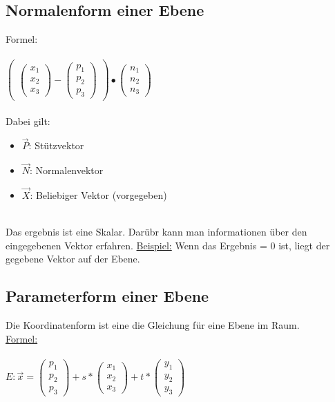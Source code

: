 \subsection{Normalenform einer Ebene}
Formel: \\\\
$
\begin{pmatrix}
    \begin{pmatrix}
        x_1 \\ x_2 \\ x_3
    \end{pmatrix}
    -
    \begin{pmatrix}
        p_1 \\ p_2 \\ p_3
    \end{pmatrix}
\end{pmatrix}
\bullet
\begin{pmatrix}
    n_1 \\ n_2 \\ n_3
\end{pmatrix}
$
\\\\
Dabei gilt:
\begin{itemize}
    \item $\vec{P}$: Stützvektor
    \item $\vec{N}$: Normalenvektor
    \item $\vec{X}$: Beliebiger Vektor (vorgegeben)
\end{itemize}
\ \\
Das ergebnis ist eine Skalar.
Darübr kann man informationen über den eingegebenen Vektor erfahren. 
\underline{Beispiel:} Wenn das Ergebnis = 0 ist, liegt der gegebene Vektor auf der Ebene.

\subsection{Parameterform einer Ebene}
Die Koordinatenform ist eine die Gleichung für eine Ebene im Raum. \\
\underline{Formel:} \\\\
$
E: \vec{x} =
\begin{pmatrix}
    p_1 \\ p_2 \\ p_3
\end{pmatrix}
+ s * 
\begin{pmatrix}
    x_1 \\ x_2 \\ x_3
\end{pmatrix}
+ t * 
\begin{pmatrix}
    y_1 \\ y_2 \\ y_3
\end{pmatrix}
$




